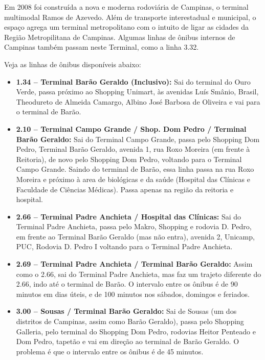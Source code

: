 Em 2008 foi construída a nova e moderna rodoviária de Campinas, o terminal
multimodal Ramos de Azevedo. Além de transporte interestadual e municipal, o
espaço agrega um terminal metropolitano com o intuito de ligar as cidades da
Região Metropilitana de Campinas. Algumas linhas de ônibus internos de Campinas
também passam neste Terminal, como a linha 3.32.

Veja as linhas de ônibus disponíveis abaixo:

\begin{itemize}
    \item  \textbf{1.34 -- Terminal Barão Geraldo (Inclusivo):} Sai do terminal
        do Ouro Verde, passa próximo ao Shopping Unimart, às avenidas Luís
        Smânio, Brasil, Theodureto de Almeida Camargo, Albino José Barbosa de
        Oliveira e vai para o terminal de Barão.

    \item  \textbf{2.10 -- Terminal Campo Grande / Shop. Dom Pedro / Terminal
        Barão Geraldo:} Sai do Terminal Campo Grande, passa pelo Shopping Dom
        Pedro, Terminal Barão Geraldo, avenida 1, rua Roxo Moreira (em frente à
        Reitoria), de novo pelo Shopping Dom Pedro, voltando para o Terminal
        Campo Grande.  Saindo do terminal de Barão, essa linha passa na rua Roxo
        Moreira e próximo à area de biológicas e da saúde (Hospital das Clínicas
        e Faculdade de Ciências Médicas). Passa apenas na região da reitoria e
        hospital.

    \item  \textbf{2.66 -- Terminal Padre Anchieta / Hospital das Clínicas:} Sai
        do Terminal Padre Anchieta, passa pelo Makro, Shopping e rodovia D.
        Pedro, em frente ao Terminal Barão Geraldo (mas não entra), avenida 2,
        Unicamp, PUC, Rodovia D. Pedro I voltando para o Terminal Padre
        Anchieta.

    \item  \textbf{2.69 -- Terminal Padre Anchieta / Terminal Barão Geraldo:}
        Assim como o 2.66, sai do Terminal Padre Anchieta, mas faz um trajeto
        diferente do 2.66, indo até o terminal de Barão. O intervalo entre os
        ônibus é de 90 minutos em dias úteis, e de 100 minutos nos sábados,
        domingos e feriados.

    \item  \textbf{3.00 -- Sousas / Terminal Barão Geraldo:} Sai de Sousas (um
        dos distritos de Campinas, assim como Barão Geraldo), passa pelo
        Shopping Galleria, pelo terminal do Shopping Dom Pedro, rodovias Heitor
        Penteado e Dom Pedro, tapetão e vai em direção ao terminal de Barão
        Geraldo.  O problema é que o intervalo entre os ônibus é de 45 minutos.


\end{itemize}
